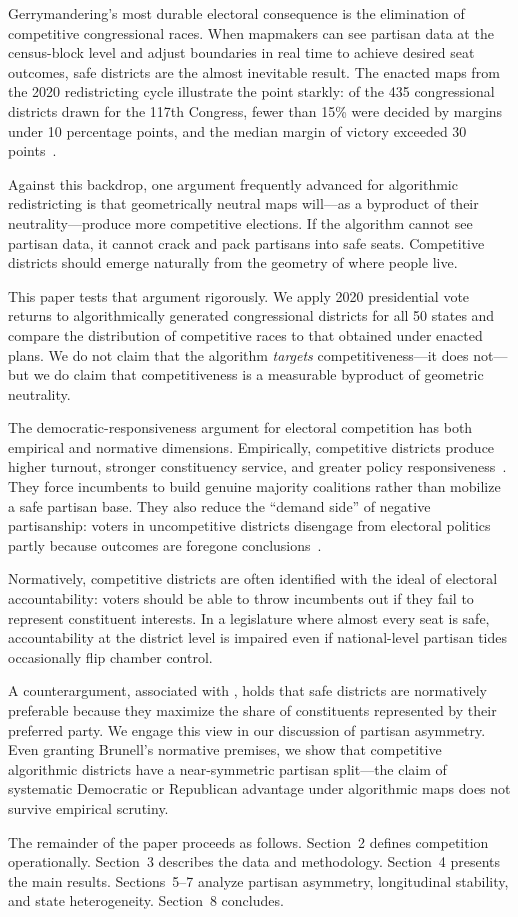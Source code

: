 \label{sec:introduction}

Gerrymandering's most durable electoral consequence is the elimination of
competitive congressional races.  When mapmakers can see partisan data at
the census-block level and adjust boundaries in real time to achieve desired
seat outcomes, safe districts are the almost inevitable result.  The enacted
maps from the 2020 redistricting cycle illustrate the point starkly: of the
435 congressional districts drawn for the 117th Congress, fewer than 15\%
were decided by margins under 10 percentage points, and the median margin of
victory exceeded 30 points~\citep{jacobson2012politics}.

Against this backdrop, one argument frequently advanced for algorithmic
redistricting is that geometrically neutral maps will---as a byproduct of
their neutrality---produce more competitive elections.  If the algorithm
cannot see partisan data, it cannot crack and pack partisans into safe seats.
Competitive districts should emerge naturally from the geometry of where
people live.

This paper tests that argument rigorously.  We apply 2020 presidential vote
returns to algorithmically generated congressional districts for all 50 states
and compare the distribution of competitive races to that obtained under
enacted plans.  We do not claim that the algorithm \emph{targets}
competitiveness---it does not---but we do claim that competitiveness is a
measurable byproduct of geometric neutrality.

The democratic-responsiveness argument for electoral competition has both
empirical and normative dimensions.  Empirically, competitive districts
produce higher turnout, stronger constituency service, and greater
policy responsiveness~\citep{jacobson2015it}.  They force incumbents to build
genuine majority coalitions rather than mobilize a safe partisan base.  They
also reduce the ``demand side'' of negative partisanship: voters in
uncompetitive districts disengage from electoral politics partly because
outcomes are foregone conclusions~\citep{abramowitz2006incumbency}.

Normatively, competitive districts are often identified with the ideal of
electoral accountability: voters should be able to throw incumbents out if
they fail to represent constituent interests.  In a legislature where almost
every seat is safe, accountability at the district level is impaired even if
national-level partisan tides occasionally flip chamber control.

A counterargument, associated with \citet{brunell2008redistricting}, holds that
safe districts are normatively preferable because they maximize the share of
constituents represented by their preferred party.  We engage this view in
our discussion of partisan asymmetry.  Even granting Brunell's normative
premises, we show that competitive algorithmic districts have a near-symmetric
partisan split---the claim of systematic Democratic or Republican advantage
under algorithmic maps does not survive empirical scrutiny.

The remainder of the paper proceeds as follows.  Section~2 defines
competition operationally.  Section~3 describes the data and methodology.
Section~4 presents the main results.  Sections~5--7 analyze partisan
asymmetry, longitudinal stability, and state heterogeneity.  Section~8
concludes.
